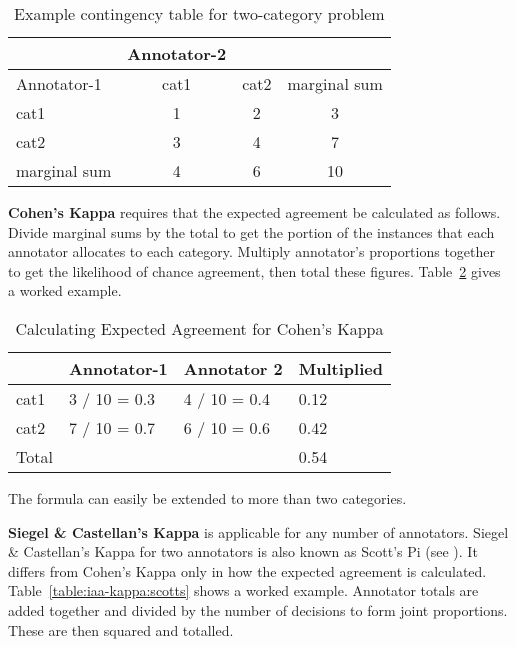\begin{table}[hbt]
{\centering
\begin{tabular}{|l|cc|c|} 
\hline
   & Annotator-2 & & \\
\hline
Annotator-1  & cat1 & cat2 & marginal sum\\
\hline
 cat1& 1 & 2 & 3\\ 
cat2 & 3 & 4 & 7\\
\hline
marginal sum & 4 & 6 &10\\
 \hline
\end{tabular}\par}
\caption{Example contingency table for two-category problem}
\label{table:iaa-kappa:contingencyex}
\end{table}

{\bf Cohen's Kappa} requires that the expected agreement be calculated as
follows. Divide marginal sums by the total to get the portion of the instances
that each annotator allocates to each category. Multiply annotator's
proportions together to get the likelihood of chance agreement, then total
these figures. Table~\ref{table:iaa-kappa:cohens} gives a worked example.

\begin{table}[hbt]
{\centering
\begin{tabular}{|l|l|l|l|} 
\hline
   & Annotator-1 & Annotator 2 & Multiplied \\
\hline
cat1 & 3 / 10 = 0.3 & 4 / 10 = 0.4 & 0.12 \\ 
cat2 & 7 / 10 = 0.7 & 6 / 10 = 0.6 & 0.42 \\
\hline
Total & & & 0.54 \\
\hline
\end{tabular}\par}
\caption{Calculating Expected Agreement for Cohen's Kappa}
\label{table:iaa-kappa:cohens}
\end{table}

The formula can easily be extended to more than two categories.

{\bf Siegel \& Castellan's Kappa} is applicable for any number of annotators.
Siegel \& Castellan's Kappa for two annotators is also known as Scott's Pi (see
\cite{Lombard02}). It differs from Cohen's Kappa only in how the expected
agreement is calculated. Table~\ref{table:iaa-kappa:scotts} shows a worked
example. Annotator totals are added together and divided by the number of
decisions to form joint proportions. These are then squared and totalled.

